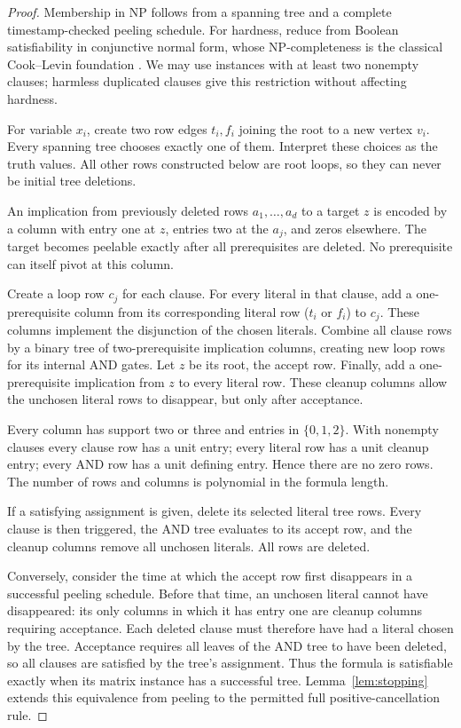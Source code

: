 \documentclass[11pt,letterpaper]{article}
\theoremstyle{definition}
\theoremstyle{remark}
\begin{document}
\begin{proof}
Membership in NP follows from a spanning tree and a complete timestamp-checked
peeling schedule. For hardness, reduce from Boolean satisfiability in conjunctive
normal form, whose NP-completeness is the classical Cook--Levin foundation
\cite{cook1971}. We may use instances with at least two nonempty clauses; harmless
duplicated clauses give this restriction without affecting hardness.

For variable $x_i$, create two row edges $t_i,f_i$ joining the root to a new
vertex $v_i$. Every spanning tree chooses exactly one of them. Interpret these
choices as the truth values. All other rows constructed below are root loops,
so they can never be initial tree deletions.

An implication from previously deleted rows $a_1,\ldots,a_d$ to a target $z$
is encoded by a column with entry one at $z$, entries two at the $a_j$, and zeros
elsewhere. The target becomes peelable exactly after all prerequisites are
deleted. No prerequisite can itself pivot at this column.

Create a loop row $c_j$ for each clause. For every literal in that clause, add a
one-prerequisite column from its corresponding literal row ($t_i$ or $f_i$) to
$c_j$. These columns implement the disjunction of the chosen literals. Combine
all clause rows by a binary tree of two-prerequisite implication columns,
creating new loop rows for its internal AND gates. Let $z$ be its root, the
accept row. Finally, add a one-prerequisite implication from $z$ to every literal
row. These cleanup columns allow the unchosen literal rows to disappear, but
only after acceptance.

Every column has support two or three and entries in $\{0,1,2\}$. With nonempty
clauses every clause row has a unit entry; every literal row has a unit cleanup
entry; every AND row has a unit defining entry. Hence there are no zero rows.
The number of rows and columns is polynomial in the formula length.

If a satisfying assignment is given, delete its selected literal tree rows.
Every clause is then triggered, the AND tree evaluates to its accept row, and
the cleanup columns remove all unchosen literals. All rows are deleted.

Conversely, consider the time at which the accept row first disappears in a
successful peeling schedule. Before that time, an unchosen literal cannot have
disappeared: its only columns in which it has entry one are cleanup columns
requiring acceptance. Each deleted clause must therefore have had a literal
chosen by the tree. Acceptance requires all leaves of the AND tree to have
been deleted, so all clauses are satisfied by the tree's assignment. Thus the
formula is satisfiable exactly when its matrix instance has a successful tree.
Lemma~\ref{lem:stopping} extends this equivalence from peeling to the permitted
full positive-cancellation rule.
\end{proof}
\end{document}
